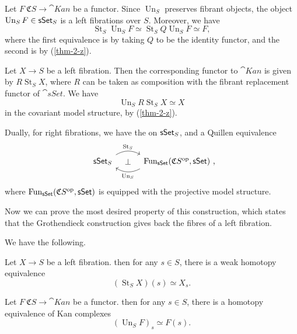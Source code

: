 \begin{itms}
    \item 
    Let $F\:\mathfrak CS\to\cat{Kan}$ be a functor.
    Since $\operatorname{Un}_S$ preserves fibrant objects,
    the object $\operatorname{Un}_SF\in\mathsf{sSet}_{\/S}$
    is a left fibrations over $S$.
    Moreover, we have
    \[ \operatorname{St}_S\operatorname{Un}_SF
    \simeq \operatorname{St}_SQ\operatorname{Un}_SF\simeq F, \]
    where the first equivalence is by taking $Q$ to be the identity functor,
    and the second is by (\ref{thm-2-z}).

    \item Let $X\to S$ be a left fibration.
    Then the corresponding functor to $\cat{Kan}$ is given by $R\operatorname{St}_SX$,
    where $R$ can be taken as composition with
    the fibrant replacement functor of $\cat{sSet}$.
    We have 
    \[ \operatorname{Un}_SR\operatorname{St}_SX\simeq X \]
    in the covariant model structure, by (\ref{thm-2-z}).
\end{itms}

\begin{remark}
    Dually, for right fibrations, we have the 
    on $\mathsf{sSet}_{\/S}$, and a Quillen equivalence
    \[\begin{tikzcd}[column sep=3em]
        \cat{sSet}_{\/S}\ar[r,bend left,start anchor=north east,end anchor=north west,"\operatorname{St}_S"]
        \ar[r,phantom,"\bot"] &
        \operatorname{Fun}_{\cat{sSet}}(\mathfrak CS\op,\cat{sSet})\rlap{\ ,}
        \ar[l,bend left,start anchor=south west,end anchor=south east,"\operatorname{Un}_S"]
    \end{tikzcd}\]
    where $\operatorname{Fun}_{\mathsf{sSet}}(\mathfrak CS^{\mathrm{op}},\mathsf{sSet})$
    is equipped with the projective model structure. \varqed
\end{remark}

Now we can prove the most desired property of this construction,
which states that the Grothendieck construction 
gives back the fibres of a left fibration.

\begin{proposition}\label{thm-5-s}
    We have the following.
    \begin{itms}
        \item Let $X\to S$ be a left fibration.
        then for any $s\in S$, there is a weak homotopy equivalence
        \[ (\operatorname{St}_SX)(s)\simeq X_s. \]
        \item Let $F\:\mathfrak CS\to\cat{Kan}$ be a functor.
        then for any $s\in S$, there is a homotopy equivalence of Kan complexes
        \[ (\operatorname{Un}_SF)_s\simeq F(s). \]
    \end{itms}
\end{proposition}

